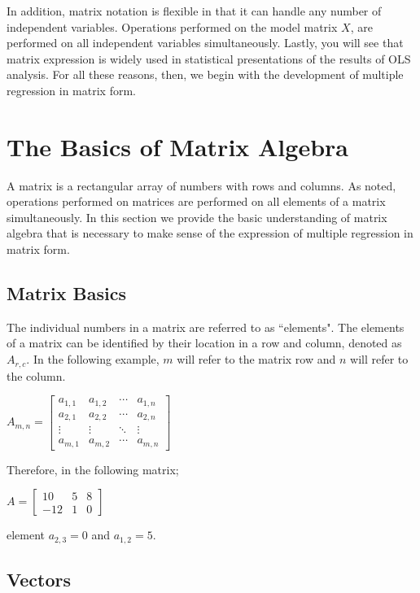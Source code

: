 \documentclass[11pt,openany]{book}\usepackage[]{graphicx}\usepackage[]{color}
\begin{document}
In addition, matrix notation is flexible in that it can handle any number of independent variables. Operations performed on the model
matrix $X$, are performed on all independent variables simultaneously. Lastly, you will see that matrix expression is widely used in statistical presentations of the results of OLS analysis. For all these reasons, then, we begin with the development of multiple regression in matrix form.

\section{The Basics of Matrix Algebra}

A matrix is a rectangular array of numbers with rows and columns. As noted, operations performed on matrices are performed on all elements of a matrix simultaneously.  In this section we provide the basic understanding of matrix algebra that is necessary to make sense of the expression of multiple regression in matrix form.

\subsection{Matrix Basics}

The individual numbers in a matrix are referred to as ``elements". The elements of a matrix can be  identified by their location in a row and column, denoted as $A_{r,c}$. In the following example, $m$ will refer to the matrix row and $n$ will refer to the column. 

$A_{m,n} =
 \begin{bmatrix}
  a_{1,1} & a_{1,2} & \cdots & a_{1,n} \\
  a_{2,1} & a_{2,2} & \cdots & a_{2,n} \\
  \vdots  & \vdots  & \ddots & \vdots  \\
  a_{m,1} & a_{m,2} & \cdots & a_{m,n}
 \end{bmatrix}$

 \noindent 
 Therefore, in the following matrix;
 
$A = 
\begin{bmatrix}
  10 & 5 & 8 \\
  -12 & 1 & 0
\end{bmatrix}$

\noindent 
element $a_{2,3} = 0$ and $a_{1,2} = 5$.

\subsection{Vectors}
\end{document}
